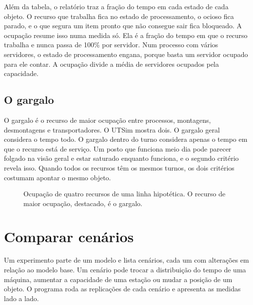 Além da tabela, o relatório traz a fração do tempo em cada estado de cada objeto. O recurso que trabalha fica no estado de processamento, o ocioso fica parado, e o que segura um item pronto que não consegue sair fica bloqueado. A ocupação resume isso numa medida só. Ela é a fração do tempo em que o recurso trabalha e nunca passa de 100\% por servidor. Num processo com vários servidores, o estado de processamento engana, porque basta um servidor ocupado para ele contar. A ocupação divide a média de servidores ocupados pela capacidade.

\subsection{O gargalo}

O gargalo é o recurso de maior ocupação entre processos, montagens, desmontagens e transportadores. O UTSim mostra dois. O gargalo geral considera o tempo todo. O gargalo dentro do turno considera apenas o tempo em que o recurso está de serviço. Um posto que funciona meio dia pode parecer folgado na visão geral e estar saturado enquanto funciona, e o segundo critério revela isso. Quando todos os recursos têm os mesmos turnos, os dois critérios costumam apontar o mesmo objeto.

\begin{figure}[ht]
\centering
{}
\caption{Ocupação de quatro recursos de uma linha hipotética. O recurso de maior ocupação, destacado, é o gargalo.}
\label{fig-gargalo}
\end{figure}

\section{Comparar cenários}

Um experimento parte de um modelo e lista cenários, cada um com alterações em relação ao modelo base. Um cenário pode trocar a distribuição do tempo de uma máquina, aumentar a capacidade de uma estação ou mudar a posição de um objeto. O programa roda as replicações de cada cenário e apresenta as medidas lado a lado.

